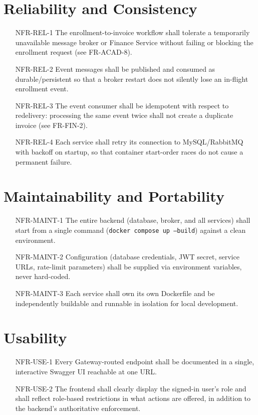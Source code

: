 \documentclass[11pt,a4paper]{report}
\begin{document}
\section{Reliability and Consistency}
\begin{itemize}[itemsep=3pt]
    \item[NFR-REL-1] The enrollment-to-invoice workflow shall tolerate a temporarily unavailable message broker or Finance Service without failing or blocking the enrollment request (see FR-ACAD-8).
    \item[NFR-REL-2] Event messages shall be published and consumed as durable/persistent so that a broker restart does not silently lose an in-flight enrollment event.
    \item[NFR-REL-3] The event consumer shall be idempotent with respect to redelivery: processing the same event twice shall not create a duplicate invoice (see FR-FIN-2).
    \item[NFR-REL-4] Each service shall retry its connection to MySQL/RabbitMQ with backoff on startup, so that container start-order races do not cause a permanent failure.
\end{itemize}

\section{Maintainability and Portability}
\begin{itemize}[itemsep=3pt]
    \item[NFR-MAINT-1] The entire backend (database, broker, and all services) shall start from a single command (\texttt{docker compose up --build}) against a clean environment.
    \item[NFR-MAINT-2] Configuration (database credentials, JWT secret, service URLs, rate-limit parameters) shall be supplied via environment variables, never hard-coded.
    \item[NFR-MAINT-3] Each service shall own its own Dockerfile and be independently buildable and runnable in isolation for local development.
\end{itemize}

\section{Usability}
\begin{itemize}[itemsep=3pt]
    \item[NFR-USE-1] Every Gateway-routed endpoint shall be documented in a single, interactive Swagger UI reachable at one URL.
    \item[NFR-USE-2] The frontend shall clearly display the signed-in user's role and shall reflect role-based restrictions in what actions are offered, in addition to the backend's authoritative enforcement.
\end{itemize}
\end{document}

